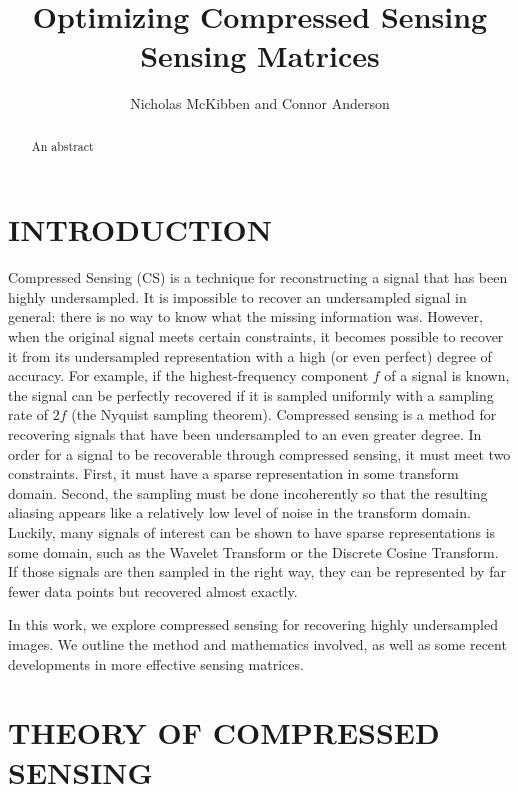 \documentclass[journal]{IEEEtran}
\title{Optimizing Compressed Sensing Sensing Matrices}
\author{Nicholas McKibben and Connor Anderson}
\begin{document}
\maketitle
\thispagestyle{empty}
\pagestyle{empty}
\begin{abstract}

An abstract

\end{abstract}
\section{INTRODUCTION}

Compressed Sensing (CS) is a technique for reconstructing a signal that has been
highly undersampled. It is impossible to recover an undersampled signal in 
general: there is no way to know what the missing information was. However, when
the original signal meets certain constraints, it becomes possible to recover it
from its undersampled representation with a high (or even perfect) degree of
accuracy. For example, if the highest-frequency component $f$ of a signal is
known, the signal can be perfectly recovered if it is sampled uniformly with a 
sampling rate of $2f$ (the Nyquist sampling theorem). Compressed sensing is a
method for recovering signals that have been undersampled to an even greater
degree. In order for a signal to be recoverable through compressed sensing, it
must meet two constraints. First, it must have a sparse representation in some
transform domain. Second, the sampling must be done incoherently so that the
resulting aliasing appears like a relatively low level of noise in the transform
domain. Luckily, many signals of interest can be shown to have sparse
representations is some domain, such as the Wavelet Transform or the Discrete
Cosine Transform. If those signals are then sampled in the right way, they can
be represented by far fewer data points but recovered almost exactly.

In this work, we explore compressed sensing for recovering highly undersampled
images. We outline the method and mathematics involved, as well as some recent
developments in more effective sensing matrices.

\section{THEORY OF COMPRESSED SENSING}
\end{document}
